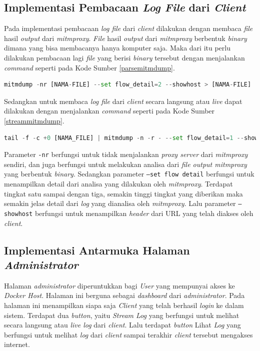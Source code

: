 \subsection{Implementasi Pembacaan \textit{Log File} dari \textit{Client}}
Pada implementasi pembacaan \textit{log file} dari \textit{client} dilakukan dengan membaca \textit{file} hasil \textit{output} dari \textit{mitmproxy}. \textit{File} hasil \textit{output} dari \textit{mitmproxy} berbentuk \textit{binary} dimana yang bisa membacanya hanya komputer saja. Maka dari itu perlu dilakukan pembacaan lagi \textit{file} yang berisi \textit{binary} tersebut dengan menjalankan \textit{command} seperti pada Kode Sumber \ref{parsemitmdump}.
\begin{lstlisting}[frame=single,tabsize=2,breaklines,captionpos=b,caption=Perintah untuk Membaca \textit{File Log} dari \textit{Mitmproxy},language=Python,label=parsemitmdump]
mitmdump -nr [NAMA-FILE] --set flow_detail=2 --showhost > [NAMA-FILE]
\end{lstlisting}

Sedangkan untuk membaca \textit{log file} dari \textit{client} secara langsung atau \textit{live} dapat dilakukan dengan menjalankan \textit{command} seperti pada Kode Sumber \ref{streammitmdump}.
\begin{lstlisting}[frame=single,tabsize=2,breaklines,captionpos=b,caption=Perintah untuk Membaca \textit{File Log} dari \textit{Client},language=Python,label=streammitmdump]
tail -f -c +0 [NAMA_FILE] | mitmdump -n -r - --set flow_detail=1 --showhost
\end{lstlisting}

Parameter \texttt{-nr} berfungsi untuk tidak menjalankan \textit{proxy server} dari \textit{mitmproxy} sendiri, dan juga berfungsi untuk melakukan analisa dari \textit{file output mitmproxy} yang berbentuk \textit{binary}. Sedangkan parameter \texttt{--set flow detail} berfungsi untuk menampilkan detail dari analisa yang dilakukan oleh \textit{mitmproxy}. Terdapat tingkat satu sampai dengan tiga, semakin tinggi tingkat yang diberikan maka semakin jelas detail dari \textit{log} yang dianalisa oleh \textit{mitmproxy}. Lalu parameter \texttt{--showhost} berfungsi untuk menampilkan \textit{header} dari URL yang telah diakses oleh \textit{client}.

\subsection{Implementasi Antarmuka Halaman \textit{Administrator}}
Halaman \textit{administrator} diperuntukkan bagi \textit{User} yang mempunyai akses ke \textit{Docker Host}. Halaman ini berguna sebagai \textit{dashboard} dari \textit{administrator}. Pada halaman ini menampilkan siapa saja \textit{Client} yang telah berhasil \textit{login} ke dalam sistem. Terdapat dua \textit{button}, yaitu \textit{Stream Log} yang berfungsi untuk melihat secara langsung atau \textit{live log} dari \textit{client}. Lalu terdapat \textit{button} Lihat \textit{Log} yang berfungsi untuk melihat \textit{log} dari \textit{client} sampai terakhir \textit{client} tersebut mengakses internet.

